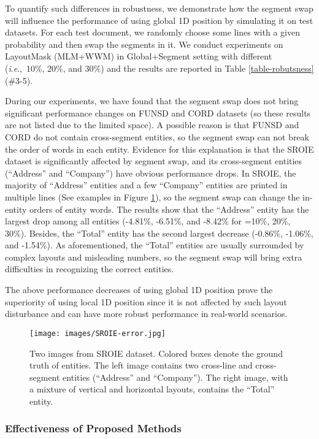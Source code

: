 \documentclass[11pt]{article}
\newcommand{\ie}{\textit{i}.\textit{e}.,\ }
\begin{document}
To quantify such differences in robustness, we demonstrate how the segment swap will influence the performance of using global 1D position by simulating it on test datasets.
For each test document, we randomly choose some lines with a given probability  and then swap the segments in it. 
We conduct experiments on LayoutMask (MLM+WWM) in Global+Segment setting with different  (\ie 10\%, 20\%, and 30\%) and the results are reported in Table \ref{table-robutsness} (\#3-5).

During our experiments, we have found that the segment swap does not bring significant performance changes on FUNSD and CORD datasets (so these results are not listed due to the limited space). 
A possible reason is that FUNSD and CORD do not contain cross-segment entities, so the segment swap can not break the order of words in each entity. 
Evidence for this explanation is that the SROIE dataset is significantly affected by segment swap, and its cross-segment entities (``Address'' and ``Company'') have obvious performance drops.
In SROIE, the majority of ``Address'' entities and a few ``Company'' entities are printed in multiple lines (See examples in Figure \ref{fig:sroie-error}), so the segment swap can change the in-entity orders of entity words. The results show that the ``Address'' entity has the largest drop among all entities (-4.81\%, -6.51\%, and -8.42\% for =10\%, 20\%, 30\%).
Besides, the ``Total'' entity has the second largest decrease (-0.86\%, -1.06\%, and -1.54\%). 
As aforementioned, the ``Total'' entities are usually surrounded by complex layouts and misleading numbers, so the segment swap will bring extra difficulties in recognizing the correct entities. 

The above performance decreases of using global 1D position prove the superiority of using local 1D position since it is not affected by such layout disturbance and can have more robust performance in real-world scenarios.


\begin{figure}[t]
	\centering
	\texttt{[image: images/SROIE-error.jpg]}
	\caption{Two images from SROIE dataset. Colored boxes denote the ground truth of entities. The left image contains two cross-line and cross-segment entities (``Address'' and ``Company''). The right image, with a mixture of vertical and horizontal layouts, contains the ``Total'' entity.}
	\label{fig:sroie-error}
\end{figure}

\subsubsection{Effectiveness of Proposed Methods}
\end{document}
